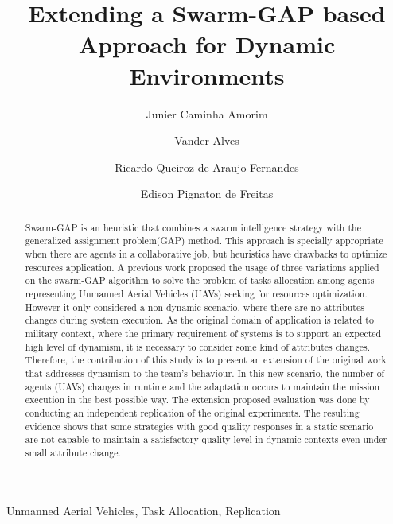 \documentclass[review]{elsarticle}
\newcommand{\uavs}{UAVs}
\begin{document}
\begin{frontmatter}
	
\title{Extending a Swarm-GAP based Approach for Dynamic Environments}

\author[unbaddress]{Junier Caminha Amorim}

\author[unbaddress]{Vander Alves}

\author[brazilianarmyaddress]{Ricardo Queiroz de Araujo Fernandes}

\author[ufrgsaddress]{Edison Pignaton de Freitas}

\address[unbaddress]{Computation Science Department University of Brasilia, Brazil}
\address[ufrgsaddress]{Institute of Informatics Federal University of Rio Grande do Sul, Brazil}
\address[brazilianarmyaddress]{Software Development Center - Brazilian Army, Brazil}

\begin{abstract}
Swarm-GAP is an heuristic that combines a swarm intelligence strategy with the generalized assignment problem(GAP) method. This approach is specially appropriate when there are agents in a collaborative job, but heuristics have drawbacks to optimize resources application. A previous work proposed the usage of three variations applied on the swarm-GAP algorithm to solve the problem of tasks allocation among agents representing Unmanned Aerial Vehicles (\uavs) seeking for resources optimization. However it only considered a non-dynamic scenario, where there are no attributes changes during system execution. As the original domain of application is related to military context, where the primary requirement of systems is to support an expected high level of dynamism, it is necessary to consider some kind of attributes changes. Therefore, the contribution of this study is to present an extension of the original work that addresses dynamism to the team's behaviour. In this new scenario, the number of agents (\uavs) changes in runtime and the adaptation occurs to maintain the mission execution in the best possible way. The extension proposed evaluation was done by conducting an independent replication of the original experiments. The resulting evidence shows that some strategies with good quality responses in a static scenario are not capable to maintain a satisfactory quality level in dynamic contexts even under small attribute change. 
\end{abstract}

\begin{keyword}
Unmanned Aerial Vehicles, Task Allocation, Replication
\end{keyword}

\end{frontmatter}
\end{document}
